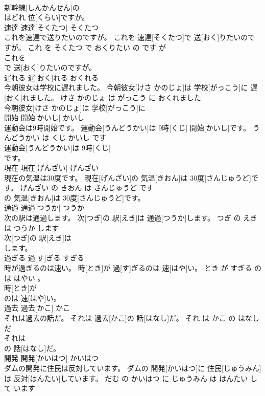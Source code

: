 \documentclass[8pt]{extreport}
\begin{document}
\begin{CJK}{UTF8}{min}
\\	新幹線[しんかんせん]の
\\	はどれ 位[くらい]ですか。			
\\	速達	速達[そくたつ]	そくたつ	
\\	これを速達で送りたいのですが。	これを 速達[そくたつ]で 送[おく]りたいのですが。	これ を そくたつ で おくりたい の です が	
\\	これを
\\	で 送[おく]りたいのですが。			
\\	遅れる	遅[おく]れる	おくれる	
\\	今朝彼女は学校に遅れました。	今朝彼女[けさ かのじょ]は 学校[がっこう]に 遅[おく]れました。	けさ かのじょ は がっこう に おくれました	
\\	今朝彼女[けさ かのじょ]は 学校[がっこう]に
\\	開始	開始[かいし]	かいし	
\\	運動会は9時開始です。	運動会[うんどうかい]は 9時[くじ] 開始[かいし]です。	うんどうかい は くじ かいし です	
\\	運動会[うんどうかい]は 9時[くじ]
\\	です。			
\\	現在	現在[げんざい]	げんざい	
\\	現在の気温は30度です。	現在[げんざい]の 気温[きおん]は 30度[さんじゅうど]です。	げんざい の きおん は さんじゅうど です	
\\	の 気温[きおん]は 30度[さんじゅうど]です。			
\\	通過	通過[つうか]	つうか	
\\	次の駅は通過します。	次[つぎ]の 駅[えき]は 通過[つうか]します。	つぎ の えき は つうか します	
\\	次[つぎ]の 駅[えき]は
\\	します。			
\\	過ぎる	過[す]ぎる	すぎる	
\\	時が過ぎるのは速い。	時[とき]が 過[す]ぎるのは 速[はや]い。	とき が すぎる の は はやい 。	
\\	時[とき]が
\\	のは 速[はや]い。			
\\	過去	過去[かこ]	かこ	
\\	それは過去の話だ。	それは 過去[かこ]の 話[はなし]だ。	それ は かこ の はなし だ	
\\	それは
\\	の 話[はなし]だ。			
\\	開発	開発[かいはつ]	かいはつ	
\\	ダムの開発に住民は反対しています。	ダムの 開発[かいはつ]に 住民[じゅうみん]は 反対[はんたい]しています。	だむ の かいはつ に じゅうみん は はんたい して います	

\end{CJK}
\end{document}
